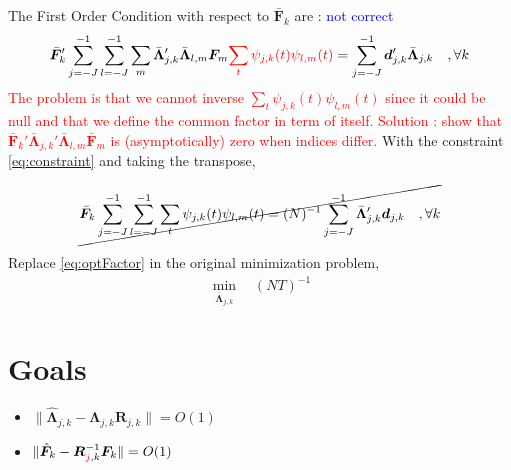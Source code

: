 \documentclass{article}
\numberwithin{equation}{section}
\let \oldsum \sum
\renewcommand{\sum}{\displaystyle \oldsum}
\newcommand{\wavelet}[3]{\psi_{#1,#2}(#3)}
\newcommand{\scalesum}{\sum_{j=-J}^{-1}}
\newcommand{\scalesumi}{\sum_{l=-J}^{-1}}
\newcommand{\coeffs}[2]{\bm{d}_{#1,#2}}
\newcommand{\optLoadings}[2]{\bar{\bm{\Lambda}}_{#1,#2}}
\newcommand{\factors}[1]{\bm{F}_{#1}}
\newcommand{\optFactors}[1]{\bar{\bm{F}}_{#1}}
\begin{document}
	The First Order Condition with respect to $\optFactors{k}$ are : \textcolor{blue}{not correct}
	\begin{align*}
		\optFactors{k}' \scalesum \scalesumi \sum_{m} \optLoadings{j}{k}' \optLoadings{l}{m} \factors{m} \textcolor{red}{\sum_t \wavelet{j}{k}{t}\wavelet{l}{m}{t}} = \scalesum \coeffs{j}{k}' \optLoadings{j}{k} \quad, \forall k
	\end{align*}
	\textcolor{red}{The problem is that we cannot inverse $\sum_t \wavelet{j}{k}{t}\wavelet{l}{m}{t}$ since it could be null and that we define the common factor in term of itself. Solution : show that $\optFactors{k}'\optLoadings{j}{k}'\optLoadings{l}{m}\optFactors{m}$ is (asymptotically) zero when indices differ.}
	With the constraint \eqref{eq:constraint} and taking the transpose,
 
	\begin{align}\label{eq:optFactor}
		\cancel{\optFactors{k} \scalesum \scalesumi \sum_t \wavelet{j}{k}{t}\wavelet{l}{m}{t} = (N)^{-1} \scalesum \optLoadings{j}{k}' \coeffs{j}{k} \quad, \forall k}
	\end{align}

	Replace \eqref{eq:optFactor} in the original minimization problem, 
	\begin{align*}
		\min_{\optLoadings{j}{k}} \quad (NT)^{-1}
	\end{align*}

\section{Goals}
\begin{itemize}
	\item $\lVert \hat{\bm{\Lambda}}_{j,k} - \bm{\Lambda}_{j,k}\bm{R}_{j,k} \rVert = O(1)$
	\item $\lVert \hat{\bm{F}}_{k} - \bm{R}^{-1}_{\textcolor{red}{j},k}\bm{F}_{k} \rVert = O(1)$
\end{itemize}

































	
\end{document}
